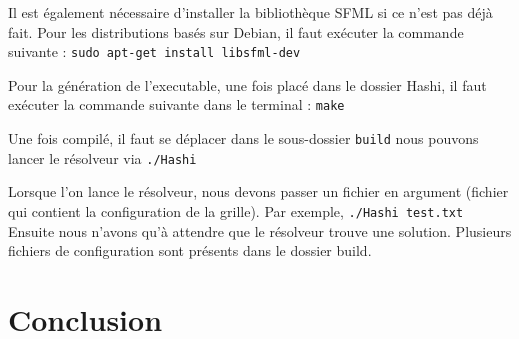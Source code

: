 \documentclass[french]{article}
\begin{document}
Il est également nécessaire d'installer la bibliothèque SFML si ce n'est pas déjà fait.
Pour les distributions basés sur Debian, il faut exécuter la commande suivante : \newline
\noindent \texttt{sudo apt-get install libsfml-dev}

Pour la génération de l'executable, une fois placé dans le dossier Hashi, il faut exécuter la commande suivante dans le terminal : \texttt{make}

Une fois compilé, il faut se déplacer dans le sous-dossier \texttt{build} nous pouvons lancer le résolveur via \texttt{./Hashi}

Lorsque l'on lance le résolveur, nous devons passer un fichier en argument (fichier qui contient la configuration de la grille).
Par exemple, \texttt{./Hashi test.txt}
Ensuite nous n'avons qu'à attendre que le résolveur trouve une solution. Plusieurs fichiers de configuration sont présents dans le dossier build.
\section{\LARGE Conclusion}
\end{document}
